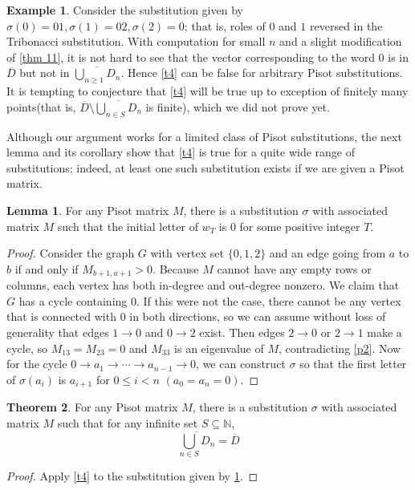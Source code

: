 \documentclass{article}
\theoremstyle{definition}
\newtheorem{theorem}{Theorem}
\newtheorem{lemma}[theorem]{Lemma}
\newtheorem*{example}{Example}
\begin{document}
\begin{example}
Consider the substitution given by $\sigma(0)=01, \sigma(1)=02, \sigma(2)=0$; that is, roles of $0$ and $1$ reversed in the Tribonacci substitution. With computation for small $n$ and a slight modification of \cref{thm 11}, it is not hard to see that the vector corresponding to the word $0$ is in $\overline{D}$ but not in $\overline{\bigcup_{n\geq1}D_n}$. Hence \cref{t4} can be false for arbitrary Pisot substitutions. It is tempting to conjecture that \cref{t4} will be true up to exception of finitely many points(that is, $\overline{D}\setminus\overline{\bigcup_{n\in S}D_n}$ is finite), which we did not prove yet.
\end{example}
Although our argument works for a limited class of Pisot substitutions, the next lemma and its corollary show that \cref{t4} is true for a quite wide range of substitutions; indeed, at least one such substitution exists if we are given a Pisot matrix.
\begin{lemma}
\label{l5}
For any Pisot matrix $M$, there is a substitution $\sigma$ with associated matrix $M$ such that the initial letter of $w_T$ is $0$ for some positive integer $T$.
\end{lemma}
\begin{proof}
Consider the graph $G$ with vertex set $\{0,1,2\}$ and an edge going from $a$ to $b$ if and only if $M_{b+1, a+1}>0$. Because $M$ cannot have any empty rows or columns, each vertex has both in-degree and out-degree nonzero. We claim that $G$ has a cycle containing $0$. If this were not the case, there cannot be any vertex that is connected with $0$ in both directions, so we can assume without loss of generality that edges $1\rightarrow0$ and $0\rightarrow 2$ exist. Then edges $2\rightarrow0$ or $2\rightarrow 1$ make a cycle, so $M_{13}=M_{23}=0$ and $M_{33}$ is an eigenvalue of $M$, contradicting \cref{p2}. Now for the cycle $0\rightarrow a_1\rightarrow\cdots\rightarrow a_{n-1}\rightarrow 0$, we can construct $\sigma$ so that the first letter of $\sigma(a_i)$ is $a_{i+1}$ for $0\leq i<n$ $(a_0=a_n=0)$.
\end{proof}

\begin{theorem}
\label{t5}
For any Pisot matrix $M$, there is a substitution $\sigma$ with associated matrix $M$ such that for any infinite set $S\subseteq\mathbb{N}$,
\[
\overline{\bigcup_{n\in S}D_n}=\overline{D}
\]
\end{theorem}
\begin{proof}
Apply \cref{t4} to the substitution given by \cref{l5}.
\end{proof}
\end{document}
